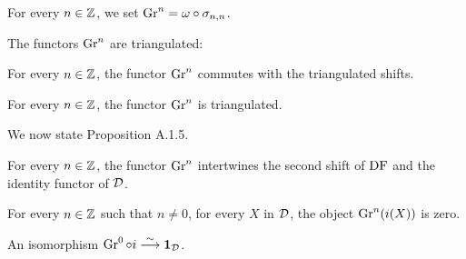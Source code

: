\begin{definition}
\label{def-Gr}

For every $n\in\mathbb{Z}$, we set $\operatorname{Gr}^n = \omega\circ\sigma_{{n,n}}$.

\end{definition}

The functors $\operatorname{Gr}^n$ are triangulated:

\begin{definition}
\label{def-Gr-commShift}

For every $n\in\mathbb{Z}$, the functor $\operatorname{Gr}^n$ commutes with the triangulated shifts.

\end{definition}

\begin{proposition}
\label{def-Gr-tri}

For every $n\in\mathbb{Z}$, the functor $\operatorname{Gr}^n$ is triangulated.

\end{proposition}

We now state Proposition A.1.5.


\begin{definition}
\label{def-Gr-commShift2}

For every $n\in\mathbb{Z}$, the functor $\operatorname{Gr}^n$ intertwines the second shift of $\operatorname{DF}$ and the identity functor of $\mathcal{D}$.

\end{definition}

\begin{proposition}
\label{prop-Gr-pure1}

For every $n\in\mathbb{Z}$ such that $n\ne 0$, for every $X$ in $\mathcal{D}$, the object $\operatorname{Gr}^n(i(X))$ is zero. 

\end{proposition}

\begin{definition}
\label{def-Gr-pure2}

An isomorphism $\operatorname{Gr}^0\circ i\stackrel{\sim}{\longrightarrow} \mathbf{1}_{\mathcal{D}}$.

\end{definition}

